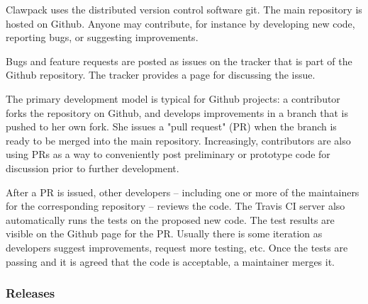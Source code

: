 Clawpack uses the distributed version control software git.
The main repository is hosted on Github.  Anyone may contribute,
for instance by developing new code, reporting bugs, or suggesting
improvements.

Bugs and feature requests are posted as issues on the tracker that
is part of the Github repository.  The tracker provides a page for
discussing the issue.

The primary development model
is typical for Github projects: a contributor forks the repository on Github,
and develops improvements in a branch that is pushed to her own fork.
She issues a "pull request" (PR) when the branch is ready to be merged
into the main repository.  Increasingly, contributors are also using
PRs as a way to conveniently post preliminary or prototype code for
discussion prior to further development.

After a PR is issued, other developers -- including one or more of the
maintainers for the corresponding repository -- reviews the code.  The Travis
CI server also automatically runs the tests on the proposed new code.  The test
results are visible on the Github page for the PR.  Usually there is some
iteration as developers suggest improvements, request more testing, etc.
Once the tests are passing and it is agreed that the code is acceptable, a
maintainer merges it.

\subsubsection{Releases}
